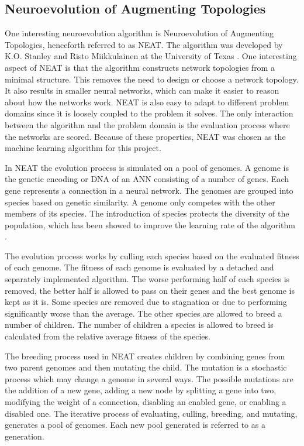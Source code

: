 \subsection{Neuroevolution of Augmenting Topologies} 
\label{theory:neat}

One interesting neuroevolution algorithm is Neuroevolution of Augmenting Topologies, henceforth referred to as NEAT. The algorithm was developed by K.O. Stanley and Risto Miikkulainen at the University of Texas \cite{stanley:neat}. One interesting aspect of NEAT is that the algorithm constructs network topologies from a minimal structure. This removes the need to design or choose a network topology. It also results in smaller neural networks, which can make it easier to reason about how the networks work. NEAT is also easy to adapt to different problem domains since it is loosely coupled to the problem it solves. The only interaction between the algorithm and the problem domain is the evaluation process where the networks are scored. Because of these properties, NEAT was chosen as the machine learning algorithm for this project. 

In NEAT the evolution process is simulated on a pool of genomes. A genome is the genetic encoding or DNA of an ANN consisting of a number of genes. Each gene represents a connection in a neural network. The genomes are grouped into species based on genetic similarity. A genome only competes with the other members of its species. The introduction of species protects the diversity of the population, which has been showed to improve the learning rate of the algorithm \cite{stanley:neat}.  

The evolution process works by culling each species based on the evaluated fitness of each genome. The fitness of each genome is evaluated by a detached and separately implemented algorithm. The worse performing half of each species is removed, the better half is allowed to pass on their genes and the best genome is kept as it is. Some species are removed due to stagnation or due to performing significantly worse than the average. The other species are allowed to breed a number of children. The number of children a species is allowed to breed is calculated from the relative average fitness of the species.

The breeding process used in NEAT creates children by combining genes from two parent genomes and then mutating the child. The mutation is a stochastic process which may change a genome in several ways. The possible mutations are the addition of a new gene, adding a new node by splitting a gene into two, modifying the weight of a connection, disabling an enabled gene, or enabling a disabled one. The iterative process of evaluating, culling, breeding, and mutating, generates a pool of genomes. Each new pool generated is referred to as a generation.

